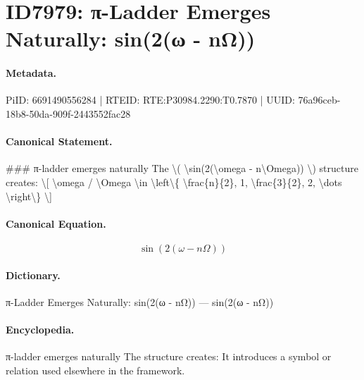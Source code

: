\section*{ID7979: π-Ladder Emerges Naturally: sin(2(ω - nΩ))}
\paragraph{Metadata.}
PiID: 6691490556284 | RTEID: RTE:P30984.2290:T0.7870 | UUID: 76a96ceb-18b8-50da-909f-2443552fac28

\paragraph{Canonical Statement.}
\#\#\# π-ladder emerges naturally The \textbackslash{}( \textbackslash{}sin(2(\textbackslash{}omega - n\textbackslash{}Omega)) \textbackslash{}) structure creates: \textbackslash{}[ \textbackslash{}omega / \textbackslash{}Omega \textbackslash{}in \textbackslash{}left\textbackslash{}\{ \textbackslash{}frac\{n\}\{2\}, 1, \textbackslash{}frac\{3\}\{2\}, 2, \textbackslash{}dots \textbackslash{}right\textbackslash{}\} \textbackslash{}]

\paragraph{Canonical Equation.}
\[
\sin(2(\omega - n\Omega))
\]

\paragraph{Dictionary.}
π-Ladder Emerges Naturally: sin(2(ω - nΩ)) — sin(2(ω - nΩ))

\paragraph{Encyclopedia.}
π-ladder emerges naturally The structure creates: It introduces a symbol or relation used elsewhere in the framework.

